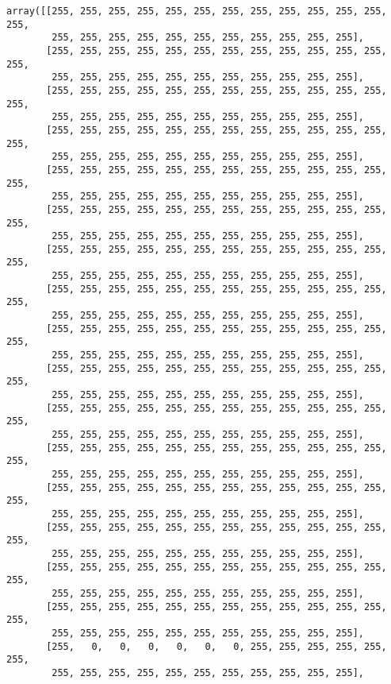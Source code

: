\documentclass[11pt]{article}
\makeatletter
\newcommand{\boxspacing}{\kern\kvtcb@left@rule\kern\kvtcb@boxsep}
\newcommand{\prompt}[4]{
        \ttfamily\llap{{\color{#2}[#3]:\hspace{3pt}#4}}\vspace{-\baselineskip}
    }
\makeatother
\begin{document}
            \begin{tcolorbox}[breakable, size=fbox, boxrule=.5pt, pad at break*=1mm, opacityfill=0]
\prompt{Out}{outcolor}{0}{\boxspacing}
\begin{Verbatim}[commandchars=\\\{\}]
array([[255, 255, 255, 255, 255, 255, 255, 255, 255, 255, 255, 255, 255,
        255, 255, 255, 255, 255, 255, 255, 255, 255, 255, 255],
       [255, 255, 255, 255, 255, 255, 255, 255, 255, 255, 255, 255, 255,
        255, 255, 255, 255, 255, 255, 255, 255, 255, 255, 255],
       [255, 255, 255, 255, 255, 255, 255, 255, 255, 255, 255, 255, 255,
        255, 255, 255, 255, 255, 255, 255, 255, 255, 255, 255],
       [255, 255, 255, 255, 255, 255, 255, 255, 255, 255, 255, 255, 255,
        255, 255, 255, 255, 255, 255, 255, 255, 255, 255, 255],
       [255, 255, 255, 255, 255, 255, 255, 255, 255, 255, 255, 255, 255,
        255, 255, 255, 255, 255, 255, 255, 255, 255, 255, 255],
       [255, 255, 255, 255, 255, 255, 255, 255, 255, 255, 255, 255, 255,
        255, 255, 255, 255, 255, 255, 255, 255, 255, 255, 255],
       [255, 255, 255, 255, 255, 255, 255, 255, 255, 255, 255, 255, 255,
        255, 255, 255, 255, 255, 255, 255, 255, 255, 255, 255],
       [255, 255, 255, 255, 255, 255, 255, 255, 255, 255, 255, 255, 255,
        255, 255, 255, 255, 255, 255, 255, 255, 255, 255, 255],
       [255, 255, 255, 255, 255, 255, 255, 255, 255, 255, 255, 255, 255,
        255, 255, 255, 255, 255, 255, 255, 255, 255, 255, 255],
       [255, 255, 255, 255, 255, 255, 255, 255, 255, 255, 255, 255, 255,
        255, 255, 255, 255, 255, 255, 255, 255, 255, 255, 255],
       [255, 255, 255, 255, 255, 255, 255, 255, 255, 255, 255, 255, 255,
        255, 255, 255, 255, 255, 255, 255, 255, 255, 255, 255],
       [255, 255, 255, 255, 255, 255, 255, 255, 255, 255, 255, 255, 255,
        255, 255, 255, 255, 255, 255, 255, 255, 255, 255, 255],
       [255, 255, 255, 255, 255, 255, 255, 255, 255, 255, 255, 255, 255,
        255, 255, 255, 255, 255, 255, 255, 255, 255, 255, 255],
       [255, 255, 255, 255, 255, 255, 255, 255, 255, 255, 255, 255, 255,
        255, 255, 255, 255, 255, 255, 255, 255, 255, 255, 255],
       [255, 255, 255, 255, 255, 255, 255, 255, 255, 255, 255, 255, 255,
        255, 255, 255, 255, 255, 255, 255, 255, 255, 255, 255],
       [255, 255, 255, 255, 255, 255, 255, 255, 255, 255, 255, 255, 255,
        255, 255, 255, 255, 255, 255, 255, 255, 255, 255, 255],
       [255,   0,   0,   0,   0,   0,   0, 255, 255, 255, 255, 255, 255,
        255, 255, 255, 255, 255, 255, 255, 255, 255, 255, 255],

\end{Verbatim}
\end{tcolorbox}
\end{document}
